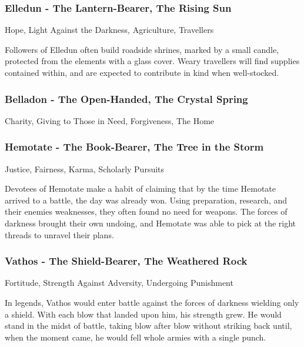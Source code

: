 \subsubsection{Elledun - The Lantern-Bearer, The Rising Sun}

\vspace{2mm}

Hope, Light Against the Darkness, Agriculture, Travellers

Followers of Elledun often build roadside shrines, marked by a small candle, protected from the elements with a glass cover. Weary travellers will find supplies contained within, and are expected to contribute in kind when well-stocked.

\subsubsection{Belladon - The Open-Handed, The Crystal Spring}

\vspace{2mm}

Charity, Giving to Those in Need, Forgiveness, The Home


\subsubsection{Hemotate - The Book-Bearer, The Tree in the Storm}

\vspace{2mm}

Justice, Fairness, Karma, Scholarly Pursuits

Devotees of Hemotate make a habit of claiming that by the time Hemotate arrived to a battle, the day was already won. Using preparation, research, and their enemies weaknesses, they often found no need for weapons. The forces of darkness brought their own undoing, and Hemotate was able to pick at the right threads to unravel their plans.

\subsubsection{Vathos - The Shield-Bearer, The Weathered Rock}

\vspace{2mm}

Fortitude, Strength Against Adversity, Undergoing Punishment

In legends, Vathos would enter battle against the forces of darkness wielding only a shield. With each blow that landed upon him, his strength grew. He would stand in the midst of battle, taking blow after blow without striking back until, when the moment came, he would fell whole armies with a single punch.

